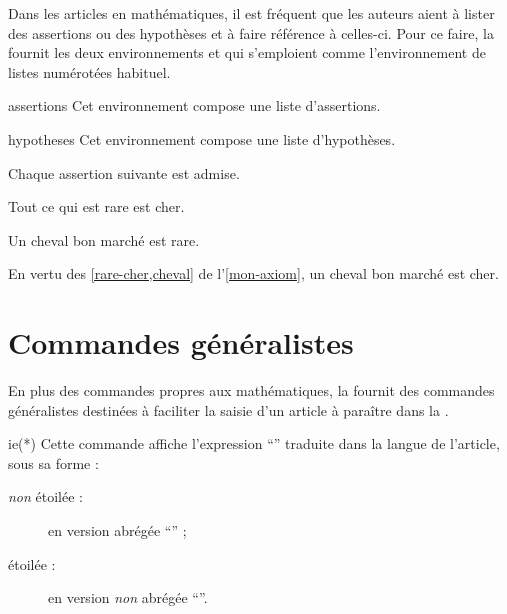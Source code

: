 Dans les articles en mathématiques, il est fréquent que les auteurs aient
à lister des assertions ou des hypothèses et à faire référence à celles-ci. Pour
ce faire, la \nwejmauthorcl{} fournit les deux environnements
 et  qui s'emploient comme l'environnement
de listes numérotées  habituel.

\begin{docEnvironment}[doclang/environment content=assertions]{assertions}{}
  Cet environnement compose une liste d'assertions.
\end{docEnvironment}
\begin{docEnvironment}[doclang/environment content=hypothèses]{hypotheses}{}
  Cet environnement compose une liste d'hypothèses.
\end{docEnvironment}

\begin{bodycode}[listing and text,listing options={deletekeywords={[1]{label}}}]
\begin{axiom}\label{mon-axiom}
  Chaque assertion suivante est admise.
  \begin{assertions}
  \item\label{rare-cher} Tout ce qui est rare est cher.
  \item\label{cheval} Un cheval bon marché est rare.
  \end{assertions}
\end{axiom}
En vertu des \vref{rare-cher,cheval} de l'\vref{mon-axiom},
un cheval bon marché est cher.
\end{bodycode}

\section{Commandes généralistes}
\label{sec:comm-gener}

En plus des commandes propres aux mathématiques, la \nwejmauthorcl{} fournit des
commandes généralistes destinées à faciliter la saisie d'un article à paraître
dans la \nwejm{}.

\begin{docCommand}{ie(*)}{}
  Cette commande affiche l'expression \enquote{\ie*{}} traduite dans la langue
  de l'article, sous sa forme :
  \begin{description}
  \item[\emph{non} étoilée :] en version abrégée \enquote{\ie{}} ;
  \item[étoilée :] en version \emph{non} abrégée \enquote{\ie*{}}.
  \end{description}
\end{docCommand}

